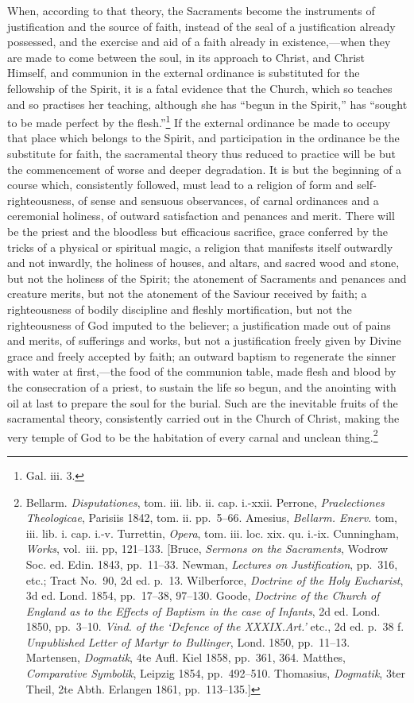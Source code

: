 \documentclass[english,]{book}
\begin{document}
When, according to that theory, the Sacraments become the instruments of justification and the source of faith, instead of the seal of a justification already possessed, and the exercise and aid of a faith already in existence,---when they are made to come between the soul, in its approach to Christ, and Christ Himself, and communion in the external ordinance is substituted for the fellowship of the Spirit, it is a fatal evidence that the Church, which so teaches and so practises her teaching, although she has ``begun in the Spirit,'' has ``sought to be made perfect by the flesh.''\footnote{Gal. iii. 3.} If the external ordinance be made to occupy that place which belongs to the Spirit, and participation in the ordinance be the substitute for faith, the sacramental theory thus reduced to practice will be but the commencement of worse and deeper degradation. It is but the beginning of a course which, consistently followed, must lead to a religion of form and self-righteousness, of sense and sensuous observances, of carnal ordinances and a ceremonial holiness, of outward satisfaction and penances and merit. There will be the priest and the bloodless but efficacious sacrifice, grace conferred by the tricks of a physical or spiritual magic, a religion that manifests itself outwardly and not inwardly, the holiness of houses, and altars, and sacred wood and stone, but not the holiness of the Spirit; the atonement of Sacraments and penances and creature merits, but not the atonement of the Saviour received by faith; a righteousness of bodily discipline and fleshly mortification, but not the righteousness of God imputed to the believer; a justification made out of pains and merits, of sufferings and works, but not a justification freely given by Divine grace and freely accepted by faith; an outward baptism to regenerate the sinner with water at first,---the food of the communion table, made flesh and blood by the consecration of a priest, to sustain the life so begun, and the anointing with oil at last to prepare the soul for the burial. Such are the inevitable fruits of the sacramental theory, consistently carried out in the Church of Christ, making the very temple of God to be the habitation of every carnal and unclean thing.\footnote{Bellarm. \emph{Disputationes}, tom. iii. lib. ii. cap. i.-xxii. Perrone, \emph{Praelectiones Theologicae}, Parisiis 1842, tom. ii. pp.~5--66. Amesius, \emph{Bellarm. Enerv}. tom, iii. lib. i. cap. i.-v. Turrettin, \emph{Opera}, tom. iii. loc. xix. qu. i.-ix. Cunningham, \emph{Works}, vol.~iii. pp, 121--133. {[}Bruce, \emph{Sermons on the Sacraments}, Wodrow Soc. ed. Edin. 1843, pp.~11--33. Newman, \emph{Lectures on Justification}, pp.~316, etc.; Tract No.~90, 2d ed. p.~13. Wilberforce, \emph{Doctrine of the Holy Eucharist}, 3d ed. Lond. 1854, pp.~17--38, 97--130. Goode, \emph{Doctrine of the Church of England as to the Effects of Baptism in the case of Infants}, 2d ed. Lond. 1850, pp.~3--10. \emph{Vind. of the `Defence of the XXXIX.Art.'} etc., 2d ed. p.~38 f. \emph{Unpublished Letter of Martyr to Bullinger}, Lond. 1850, pp.~11--13. Martensen, \emph{Dogmatik}, 4te Aufl. Kiel 1858, pp.~361, 364. Matthes, \emph{Comparative Symbolik}, Leipzig 1854, pp.~492--510. Thomasius, \emph{Dogmatik}, 3ter Theil, 2te Abth. Erlangen 1861, pp.~113--135.{]}}
\end{document}
